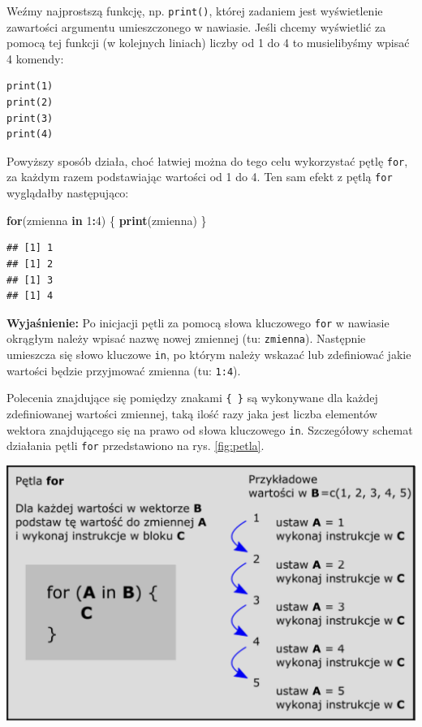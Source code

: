 \documentclass[]{book}
\newenvironment{Shaded}{\begin{snugshade}}{\end{snugshade}}
\newcommand{\KeywordTok}[1]{\textcolor[rgb]{0.13,0.29,0.53}{\textbf{#1}}}
\newcommand{\DecValTok}[1]{\textcolor[rgb]{0.00,0.00,0.81}{#1}}
\newcommand{\ControlFlowTok}[1]{\textcolor[rgb]{0.13,0.29,0.53}{\textbf{#1}}}
\newcommand{\OperatorTok}[1]{\textcolor[rgb]{0.81,0.36,0.00}{\textbf{#1}}}
\newcommand{\NormalTok}[1]{#1}
\theoremstyle{definition}
\theoremstyle{definition}
\theoremstyle{definition}
\theoremstyle{remark}
\begin{document}
Weźmy najprostszą funkcję, np. \texttt{print()}, której zadaniem jest
wyświetlenie zawartości argumentu umieszczonego w nawiasie. Jeśli chcemy
wyświetlić za pomocą tej funkcji (w kolejnych liniach) liczby od 1 do 4
to musielibyśmy wpisać 4 komendy:

\begin{verbatim}
print(1)
print(2)
print(3)
print(4)
\end{verbatim}

Powyższy sposób działa, choć łatwiej można do tego celu wykorzystać
pętlę \texttt{for}, za każdym razem podstawiając wartości od 1 do 4. Ten
sam efekt z pętlą \texttt{for} wyglądałby następująco:

\begin{Shaded}
\begin{Highlighting}[]
\ControlFlowTok{for}\NormalTok{(zmienna }\ControlFlowTok{in} \DecValTok{1}\OperatorTok{:}\DecValTok{4}\NormalTok{) \{}
  \KeywordTok{print}\NormalTok{(zmienna)}
\NormalTok{\}}
\end{Highlighting}
\end{Shaded}

\begin{verbatim}
## [1] 1
## [1] 2
## [1] 3
## [1] 4
\end{verbatim}

\textbf{Wyjaśnienie:} Po inicjacji pętli za pomocą słowa kluczowego
\texttt{for} w nawiasie okrągłym należy wpisać nazwę nowej zmiennej (tu:
\texttt{zmienna}). Następnie umieszcza się słowo kluczowe \texttt{in},
po którym należy wskazać lub zdefiniować jakie wartości będzie
przyjmować zmienna (tu: \texttt{1:4}).

Polecenia znajdujące się pomiędzy znakami \texttt{\{\ \}} są wykonywane
dla każdej zdefiniowanej wartości zmiennej, taką ilość razy jaka jest
liczba elementów wektora znajdującego się na prawo od słowa kluczowego
\texttt{in}. Szczegółowy schemat działania pętli \texttt{for}
przedstawiono na rys. \ref{fig:petla}.

\includegraphics{figures/petla_pogromcy.png} \label{fig:petla}
\end{document}
